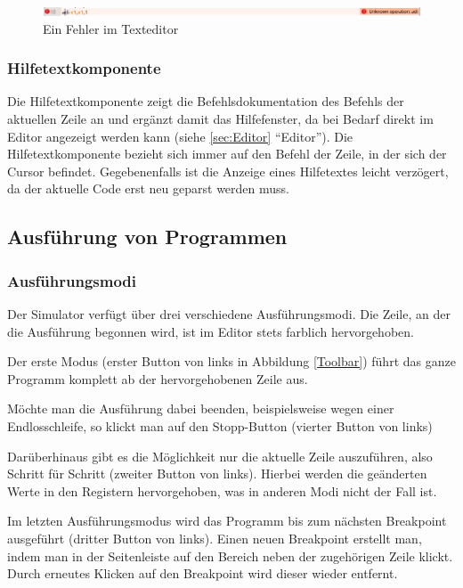 \begin{figure}[ht]
	\centering
  \includegraphics[width=\textwidth]{Images/Editor_error}
	\caption{Ein Fehler im Texteditor}
	\label{Editor_Error}
\end{figure}


\subsubsection{Hilfetextkomponente}
\label{help-component}

Die Hilfetextkomponente zeigt die Befehlsdokumentation des Befehls der aktuellen Zeile an und ergänzt damit das Hilfefenster, da bei Bedarf direkt im Editor angezeigt werden kann (siehe \ref{sec:Editor} ``Editor''). Die Hilfetextkomponente bezieht sich immer auf den Befehl der Zeile, in der sich der Cursor befindet. Gegebenenfalls ist die Anzeige eines Hilfetextes leicht verzögert, da der aktuelle Code erst neu geparst werden muss.


\subsection{Ausführung von Programmen}

\subsubsection{Ausführungsmodi}

Der Simulator verfügt über drei verschiedene Ausführungsmodi. Die Zeile, an der die Ausführung begonnen wird, ist im Editor stets farblich hervorgehoben.

Der erste Modus (erster Button von links in Abbildung \ref{Toolbar}) führt das ganze Programm komplett ab der hervorgehobenen Zeile aus.

Möchte man die Ausführung dabei beenden, beispielsweise wegen einer Endlosschleife, so klickt man auf den Stopp-Button (vierter Button von links)

Darüberhinaus gibt es die Möglichkeit nur die aktuelle Zeile auszuführen, also Schritt für Schritt (zweiter Button von links). Hierbei werden die geänderten Werte in den Registern hervorgehoben, was in anderen Modi nicht der Fall ist.

Im letzten Ausführungsmodus wird das Programm bis zum nächsten Breakpoint ausgeführt (dritter Button von links). Einen neuen Breakpoint erstellt man, indem man in der Seitenleiste auf den Bereich neben der zugehörigen Zeile klickt. Durch erneutes Klicken auf den Breakpoint wird dieser wieder entfernt.

